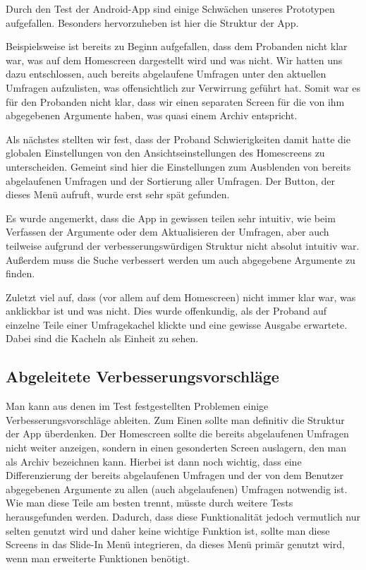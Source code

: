 Durch den Test der Android-App sind einige Schwächen unseres Prototypen aufgefallen. Besonders hervorzuheben ist hier die Struktur der App.

Beispielsweise ist bereits zu Beginn aufgefallen, dass dem Probanden nicht klar war, was auf dem Homescreen dargestellt wird und was nicht. Wir hatten uns dazu entschlossen, auch bereits abgelaufene Umfragen unter den aktuellen Umfragen aufzulisten, was offensichtlich zur Verwirrung geführt hat. Somit war es für den Probanden nicht klar, dass wir einen separaten Screen für die von ihm abgegebenen Argumente haben, was quasi einem Archiv entspricht.

Als nächstes stellten wir fest, dass der Proband Schwierigkeiten damit hatte die globalen Einstellungen von den Ansichtseinstellungen des Homescreens zu unterscheiden. Gemeint sind hier die Einstellungen zum Ausblenden von bereits abgelaufenen Umfragen und der Sortierung aller Umfragen. Der Button, der dieses Menü aufruft, wurde erst sehr spät gefunden.

Es wurde angemerkt, dass die App in gewissen teilen sehr intuitiv, wie beim Verfassen der Argumente oder dem Aktualisieren der Umfragen, aber auch teilweise aufgrund der verbesserungswürdigen Struktur nicht absolut intuitiv war.
Außerdem muss die Suche verbessert werden um auch abgegebene Argumente zu finden.

Zuletzt viel auf, dass (vor allem auf dem Homescreen) nicht immer klar war, was anklickbar ist und was nicht. Dies wurde offenkundig, als der Proband auf einzelne Teile einer Umfragekachel klickte und eine gewisse Ausgabe erwartete. Dabei sind die Kacheln als Einheit zu sehen.

\subsection{Abgeleitete Verbesserungsvorschläge}
\label{sec:verbesserungsvorschlaege}

Man kann aus denen im Test festgestellten Problemen einige Verbesserungsvorschläge ableiten. Zum Einen sollte man definitiv die Struktur der App überdenken. Der Homescreen sollte die bereits abgelaufenen Umfragen nicht weiter anzeigen, sondern in einen gesonderten Screen auslagern, den man als Archiv bezeichnen kann. Hierbei ist dann noch wichtig, dass eine Differenzierung der bereits abgelaufenen Umfragen und der von dem Benutzer abgegebenen Argumente zu allen (auch abgelaufenen) Umfragen notwendig ist. Wie man diese Teile am besten trennt, müsste durch weitere Tests herausgefunden werden. Dadurch, dass diese Funktionalität jedoch vermutlich nur selten genutzt wird und daher keine wichtige Funktion ist, sollte man diese Screens in das Slide-In Menü integrieren, da dieses Menü primär genutzt wird, wenn man erweiterte Funktionen benötigt.

